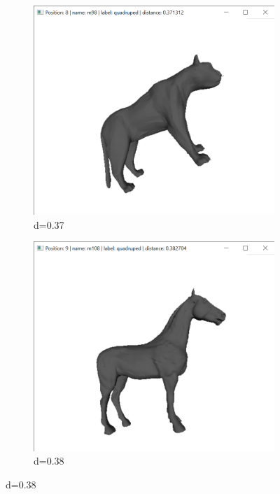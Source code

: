 \documentclass{bigdata}
\begin{document}
\begin{figure}[h!]
\begin{subfigure}[b]{0.09\linewidth}
    \includegraphics[width=\linewidth]{Pictures/Evaluation/m92/pos8.png}
    \caption*{d=0.37}
  \end{subfigure}
  \begin{subfigure}[b]{0.09\linewidth}
    \includegraphics[width=\linewidth]{Pictures/Evaluation/m92/pos9.png}
    \caption*{d=0.38}
  \end{subfigure}


\end{figure}
\end{document}
